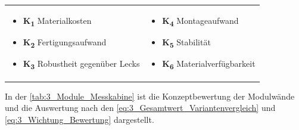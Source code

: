 \begin{tabular}{l l}
    \centering
    \hspace*{1cm} \parbox[c][3cm]{7cm}{
        \begin{itemize}[]
            \item \textbf{K\textsubscript{1}} Materialkosten
            \item \textbf{K\textsubscript{2}} Fertigungsaufwand
            \item \textbf{K\textsubscript{3}} Robustheit gegenüber Lecks
        \end{itemize}
    }&
    \parbox[c]{7cm}{
        \begin{itemize}[]
            \item \textbf{K\textsubscript{4}} Montageaufwand
            \item \textbf{K\textsubscript{5}} Stabilität
            \item \textbf{K\textsubscript{6}} Materialverfügbarkeit
        \end{itemize}
    }
\end{tabular}

In der \Tabelle\ref{tab:3_Module_Messkabine} ist die Konzeptbewertung der Modulwände und die Auswertung nach den \mbox{\Gleichungen} \eqref{eq:3_Gesamtwert_Variantenvergleich} und \eqref{eq:3_Wichtung_Bewertung} dargestellt.


